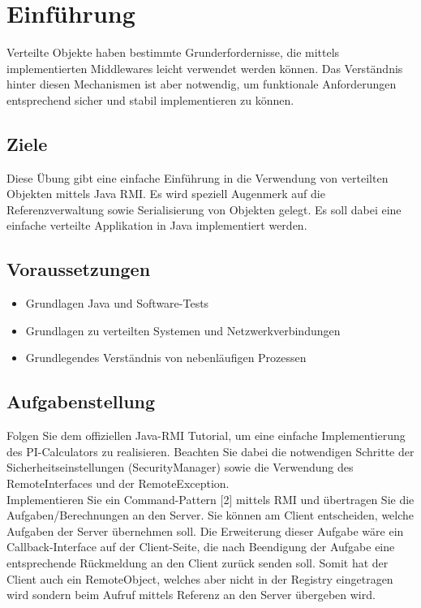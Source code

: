 
\section{Einführung}

Verteilte Objekte haben bestimmte Grunderfordernisse, die mittels implementierten Middlewares leicht verwendet werden können. Das Verständnis hinter diesen Mechanismen ist aber notwendig, um funktionale Anforderungen entsprechend sicher und stabil implementieren zu können.

\subsection{Ziele}

Diese Übung gibt eine einfache Einführung in die Verwendung von verteilten Objekten mittels Java RMI. Es wird speziell Augenmerk auf die Referenzverwaltung sowie Serialisierung von Objekten gelegt. Es soll dabei eine einfache verteilte Applikation in Java implementiert werden.

\subsection{Voraussetzungen}


\begin{itemize}
	\item Grundlagen Java und Software-Tests
    \item Grundlagen zu verteilten Systemen und Netzwerkverbindungen
    \item Grundlegendes Verständnis von nebenläufigen Prozessen
\end{itemize}

\subsection{Aufgabenstellung}

Folgen Sie dem offiziellen Java-RMI Tutorial, um eine einfache Implementierung des PI-Calculators zu realisieren. Beachten Sie dabei die notwendigen Schritte der Sicherheitseinstellungen (SecurityManager) sowie die Verwendung des RemoteInterfaces und der RemoteException.\\

Implementieren Sie ein Command-Pattern [2] mittels RMI und übertragen Sie die Aufgaben/Berechnungen an den Server. Sie können am Client entscheiden, welche Aufgaben der Server übernehmen soll. Die Erweiterung dieser Aufgabe wäre ein Callback-Interface auf der Client-Seite, die nach Beendigung der Aufgabe eine entsprechende Rückmeldung an den Client zurück senden soll. Somit hat der Client auch ein RemoteObject, welches aber nicht in der Registry eingetragen wird sondern beim Aufruf mittels Referenz an den Server übergeben wird.
\clearpage
